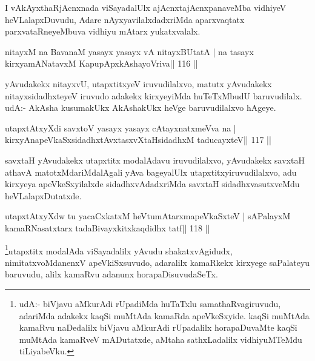 \begin{artha}
I vAkAyxthaRjAcnxnada viSayadalUlx ajAcnxtajAcnxpanaveMba vidhiyeV heVLalapxDuvudu, Adare nAyxyavilalxdadxriMda aparxvaqtatx parxvataRneyeMbuva vidhiyu mAtarx yukatxvalalx.
\end{artha}


\begin{shl}
nitayxM na BavanaM yasayx yasayx vA nitayxBUtatA |
na tasayx kirxyamANatavxM KapupApxkAshayoVriva\hfill || 116 ||
\end{shl}

\begin{artha}
yAvudakekx nitayxvU, utapxtitxyeV iruvudilalxvo, matutx yAvudakekx nitayxsidadhxteyeV iruvudo adakekx kirxyeyiMda huTeTxMbudU baruvudilalx. udA:- AkAsha kusumakUkx AkAshakUkx heVge baruvudilalxvo hAgeye.
\end{artha}


\begin{shl}
utapxtAtxyXdi savxtoV yasayx yasayx cAtayxnatxmeVva na |
kirxyAnapeVkaSxsidadhxtAvxtasxvXtaHsidadhxM taducayxteV\hfill || 117 ||
\end{shl}

\begin{artha}
savxtaH yAvudakekx utapxtitx modalAdavu iruvudilalxvo, yAvudakekx savxtaH athavA matotxMdariMdalAgali yAva bageyalUlx utapxtitxyiruvudilalxvo, adu kirxyeya apeVkeSxyilalxde sidadhxvAdadxriMda savxtaH sidadhxvasutxveMdu heVLalapxDutatxde. 
\end{artha}

\begin{shl}
utapxtAtxyXdw tu yacaCxkatxM heVtumAtarxmapeVkaSxteV |
sAPalayxM kamaRNasatxtarx tadaBivayxkitxkaqdidhx tatf\hfill || 118 ||
\end{shl}

\begin{artha}
\footnote[2]{udA:- biVjavu aMkurAdi rUpadiMda huTaTxlu samathaRvagiruvudu, adariMda adakekx kaqSi muMtAda kamaRda apeVkeSxyide. kaqSi muMtAda kamaRvu naDedalilx biVjavu aMkurAdi rUpadalilx horapaDuvaMte kaqSi muMtAda kamaRveV mADutatxde, aMtaha sathxLadalilx vidhiyuMTeMdu tiLiyabeVku.}utapxtitx modalAda viSayadalilx yAvudu shakatxvAgidudx, nimitatxvoMdanenxV apeVkiSxsuvudo, adaralilx kamaRkekx kirxyege saPalateyu baruvudu, alilx kamaRvu adanunx horapaDisuvudaSeTx.
\end{artha}

